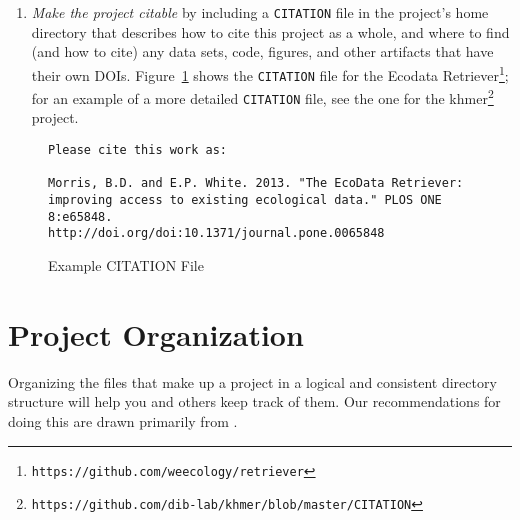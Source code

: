 \documentclass[10pt]{article}
\newcommand{\recommend}[1]{\textit{#1}}
\newcommand{\withurl}[2]{{#1}\footnote{\texttt{#2}}}
\begin{document}
\begin{enumerate}
  \begin{quote}
    \noindent \textbf{What Not To Do}

    We recommend \emph{against} the ``no commercial use'' variations
    of the Creative Commons licenses because they may impede some
    forms of re-use.  For example, if a researcher in a developing
    country is being paid by her government to compile a public health
    report, she will be unable to include your data if the license says
    ``non-commercial''. We recommend permissive software licenses rather
    than the \withurl{GNU General Public
      License}{https://www.safaribooksonline.com/library/view/understanding-open-source/0596005814/ch03.html}
    (GPL) because it is easier to integrate permissively-licensed
    software into other projects.
  \end{quote}

\item
  \recommend{Make the project citable} by including a
  \texttt{CITATION} file in the project's home directory that
  describes how to cite this project as a whole, and where to find (and how to cite)
  any data sets, code, figures, and other artifacts
  that have their own DOIs.  Figure~\ref{fig:citation} shows the
  \texttt{CITATION} file for the \withurl{Ecodata
    Retriever}{https://github.com/weecology/retriever}; for an example
  of a more detailed \texttt{CITATION} file, see the one for the
  \withurl{khmer}{https://github.com/dib-lab/khmer/blob/master/CITATION}
  project.

\end{enumerate}

\begin{figure}
\begin{verbatim}
Please cite this work as:

Morris, B.D. and E.P. White. 2013. "The EcoData Retriever:
improving access to existing ecological data." PLOS ONE 8:e65848.
http://doi.org/doi:10.1371/journal.pone.0065848
\end{verbatim}
\caption{Example CITATION File}
\label{fig:citation}
\end{figure}

\section{Project Organization}\label{sec:project}

Organizing the files that make up a project in a logical and
consistent directory structure will help you and others keep track of
them.  Our recommendations for doing this are drawn primarily from
\cite{noble2009,gentzkow2014}.
\end{document}
